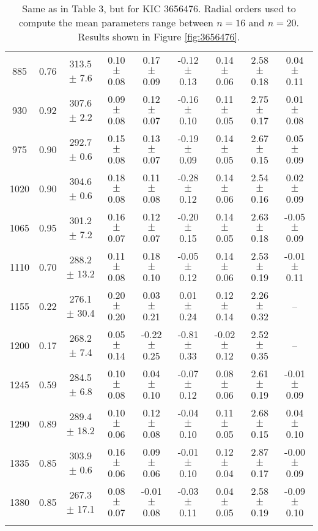 \documentclass[twocolumn]{aastex61}%
\begin{document}
\begin{table*}[ht]
\begin{tabular}{ccc|ccccc|c}
885 & 0.76 & 313.5 $\pm$ 7.6 & 0.10 $\pm$ 0.08 & 0.17 $\pm$ 0.09 & -0.12 $\pm$ 0.13 & 0.14 $\pm$ 0.06 & 2.58 $\pm$ 0.18 & 0.04 $\pm$ 0.11\\
930 & 0.92 & 307.6 $\pm$ 2.2 & 0.09 $\pm$ 0.08 & 0.12 $\pm$ 0.07 & -0.16 $\pm$ 0.10 & 0.11 $\pm$ 0.05 & 2.75 $\pm$ 0.17 & 0.01 $\pm$ 0.08\\
975 & 0.90 & 292.7 $\pm$ 0.6 & 0.15 $\pm$ 0.08 & 0.13 $\pm$ 0.07 & -0.19 $\pm$ 0.09 & 0.14 $\pm$ 0.05 & 2.67 $\pm$ 0.15 & 0.05 $\pm$ 0.09\\
1020 & 0.90 & 304.6 $\pm$ 0.6 & 0.18 $\pm$ 0.08 & 0.11 $\pm$ 0.08 & -0.28 $\pm$ 0.12 & 0.14 $\pm$ 0.06 & 2.54 $\pm$ 0.16 & 0.02 $\pm$ 0.09\\
1065 & 0.95 & 301.2 $\pm$ 7.2 & 0.16 $\pm$ 0.07 & 0.12 $\pm$ 0.07 & -0.20 $\pm$ 0.15 & 0.14 $\pm$ 0.05 & 2.63 $\pm$ 0.18 & -0.05 $\pm$ 0.09\\
1110 & 0.70 & 288.2 $\pm$ 13.2 & 0.11 $\pm$ 0.08 & 0.18 $\pm$ 0.10 & -0.05 $\pm$ 0.12 & 0.14 $\pm$ 0.06 & 2.53 $\pm$ 0.19 & -0.01 $\pm$ 0.11\\
1155 & 0.22 & 276.1 $\pm$ 30.4 & 0.20 $\pm$ 0.20 & 0.03 $\pm$ 0.21 & 0.01 $\pm$ 0.24 & 0.12 $\pm$ 0.14 & 2.26 $\pm$ 0.32 & --\\
1200 & 0.17 & 268.2 $\pm$ 7.4 & 0.05 $\pm$ 0.14 & -0.22 $\pm$ 0.25 & -0.81 $\pm$ 0.33 & -0.02 $\pm$ 0.12 & 2.52 $\pm$ 0.35 & --\\
1245 & 0.59 & 284.5 $\pm$ 6.8 & 0.10 $\pm$ 0.08 & 0.04 $\pm$ 0.10 & -0.07 $\pm$ 0.12 & 0.08 $\pm$ 0.06 & 2.61 $\pm$ 0.19 & -0.01 $\pm$ 0.09\\
1290 & 0.89 & 289.4 $\pm$ 18.2 & 0.10 $\pm$ 0.06 & 0.12 $\pm$ 0.08 & -0.04 $\pm$ 0.10 & 0.11 $\pm$ 0.05 & 2.68 $\pm$ 0.15 & 0.04 $\pm$ 0.10\\
1335 & 0.85 & 303.9 $\pm$ 0.6 & 0.16 $\pm$ 0.06 & 0.09 $\pm$ 0.06 & -0.01 $\pm$ 0.10 & 0.12 $\pm$ 0.04 & 2.87 $\pm$ 0.17 & -0.00 $\pm$ 0.09\\
1380 & 0.85 & 267.3 $\pm$ 17.1 & 0.08 $\pm$ 0.07 & -0.01 $\pm$ 0.08 & -0.03 $\pm$ 0.11 & 0.04 $\pm$ 0.05 & 2.58 $\pm$ 0.19 & -0.09 $\pm$ 0.10\\
\vspace{-0.35cm}
\end{tabular}
\caption{Same as in Table 3, but for KIC 3656476. Radial orders used to compute the mean parameters range between $n=16$ and $n=20$. Results shown in Figure \ref{fig:3656476}.}\label{tab:3656476}\vspace{-1cm}
\end{table*}
\end{document}
